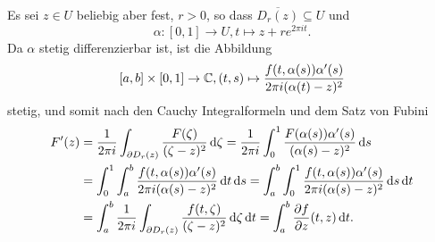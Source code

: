 \documentclass[a4paper,10pt]{article}
\begin{document}
Es sei $z \in U$ beliebig aber fest, $r > 0$, so dass $\overline{D_r(z)} \subseteq U$ und
\[
 \alpha : [0,1] \to U, t \mapsto z + re^{2 \pi i t}.
\]
Da $\alpha$ stetig differenzierbar ist, ist die Abbildung
\[
 [a,b] \times [0,1] \to \mathbb{C}, (t,s) \mapsto \frac{f(t,\alpha(s)) \alpha'(s)}{2 \pi i (\alpha(t)-z)^2}
\]
stetig, und somit nach den Cauchy Integralformeln und dem Satz von Fubini
\begin{align*}
 F'(z)
 &= \frac{1}{2 \pi i} \int_{\partial D_r(z)} \frac{F(\zeta)}{(\zeta-z)^2} \,\text{d}\zeta
 = \frac{1}{2 \pi i } \int_0^1 \frac{F(\alpha(s))\alpha'(s)}{(\alpha(s)-z)^2} \,\text{d}s \\
 &= \int_0^1 \int_a^b \frac{f(t,\alpha(s))\alpha'(s)}{2 \pi i (\alpha(s)-z)^2} \,\text{d}t \,\text{d}s
 = \int_a^b \int_0^1 \frac{f(t,\alpha(s))\alpha'(s)}{2 \pi i (\alpha(s)-z)^2} \,\text{d}s \,\text{d}t \\
 &= \int_a^b \frac{1}{2 \pi i} \int_{\partial D_r(z)} \frac{f(t,\zeta)}{(\zeta-z)^2} \,\text{d}\zeta \,\text{d}t
 = \int_a^b \frac{\partial f}{\partial z}(t,z) \,\text{d}t.
\end{align*}
\end{document}
